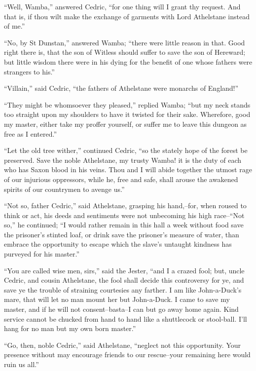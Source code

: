 ``Well, Wamba,'' answered Cedric, ``for one thing will I grant thy
request. And that is, if thou wilt make the exchange of garments with
Lord Athelstane instead of me.''

``No, by St Dunstan,'' answered Wamba; ``there were little reason in
that. Good right there is, that the son of Witless should suffer to save
the son of Hereward; but little wisdom there were in his dying for the
benefit of one whose fathers were strangers to his.''

``Villain,'' said Cedric, ``the fathers of Athelstane were monarchs of
England!''

``They might be whomsoever they pleased,'' replied Wamba; ``but my neck
stands too straight upon my shoulders to have it twisted for their sake.
Wherefore, good my master, either take my proffer yourself, or suffer me
to leave this dungeon as free as I entered.''

``Let the old tree wither,'' continued Cedric, ``so the stately hope of
the forest be preserved. Save the noble Athelstane, my trusty Wamba! it
is the duty of each who has Saxon blood in his veins. Thou and I will
abide together the utmost rage of our injurious oppressors, while he,
free and safe, shall arouse the awakened spirits of our countrymen to
avenge us.''

``Not so, father Cedric,'' said Athelstane, grasping his hand,--for,
when roused to think or act, his deeds and sentiments were not
unbecoming his high race--``Not so,'' he continued; ``I would rather
remain in this hall a week without food save the prisoner's stinted
loaf, or drink save the prisoner's measure of water, than embrace the
opportunity to escape which the slave's untaught kindness has purveyed
for his master.''

``You are called wise men, sirs,'' said the Jester, ``and I a crazed
fool; but, uncle Cedric, and cousin Athelstane, the fool shall decide
this controversy for ye, and save ye the trouble of straining courtesies
any farther. I am like John-a-Duck's mare, that will let no man mount
her but John-a-Duck. I came to save my master, and if he will not
consent--basta--I can but go away home again. Kind service cannot be
chucked from hand to hand like a shuttlecock or stool-ball. I'll hang
for no man but my own born master.''

``Go, then, noble Cedric,'' said Athelstane, ``neglect not this
opportunity. Your presence without may encourage friends to our
rescue--your remaining here would ruin us all.''

